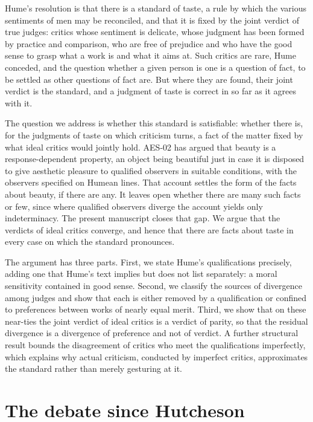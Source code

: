 \documentclass{situationist-preprint}
\begin{document}
Hume's resolution is that there is a standard of taste, a rule by which the various sentiments of men may be reconciled, and that it is fixed by the joint verdict of true judges: critics whose sentiment is delicate, whose judgment has been formed by practice and comparison, who are free of prejudice and who have the good sense to grasp what a work is and what it aims at. Such critics are rare, Hume conceded, and the question whether a given person is one is a question of fact, to be settled as other questions of fact are. But where they are found, their joint verdict is the standard, and a judgment of taste is correct in so far as it agrees with it.

The question we address is whether this standard is satisfiable: whether there is, for the judgments of taste on which criticism turns, a fact of the matter fixed by what ideal critics would jointly hold. AES-02 has argued that beauty is a response-dependent property, an object being beautiful just in case it is disposed to give aesthetic pleasure to qualified observers in suitable conditions, with the observers specified on Humean lines. That account settles the form of the facts about beauty, if there are any. It leaves open whether there are many such facts or few, since where qualified observers diverge the account yields only indeterminacy. The present manuscript closes that gap. We argue that the verdicts of ideal critics converge, and hence that there are facts about taste in every case on which the standard pronounces.

The argument has three parts. First, we state Hume's qualifications precisely, adding one that Hume's text implies but does not list separately: a moral sensitivity contained in good sense. Second, we classify the sources of divergence among judges and show that each is either removed by a qualification or confined to preferences between works of nearly equal merit. Third, we show that on these near-ties the joint verdict of ideal critics is a verdict of parity, so that the residual divergence is a divergence of preference and not of verdict. A further structural result bounds the disagreement of critics who meet the qualifications imperfectly, which explains why actual criticism, conducted by imperfect critics, approximates the standard rather than merely gesturing at it.

\section{The debate since Hutcheson}
\end{document}
